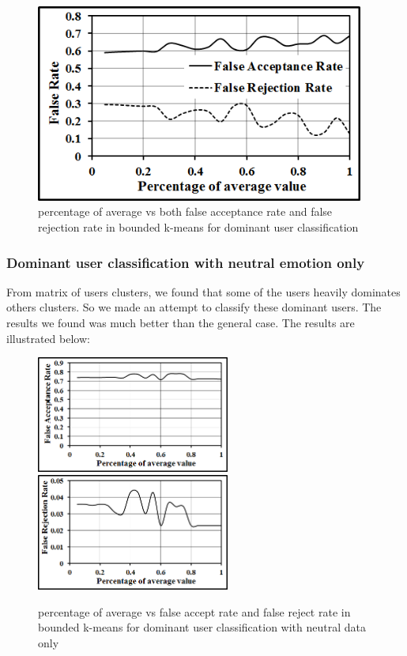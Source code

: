 \begin{figure}
\centering
\includegraphics[width=4.25in,clip,keepaspectratio]{Chapters/figures/User/dominant/fAfR}
\caption{percentage of average vs both false acceptance rate and false rejection rate in bounded k-means for dominant user classification}
\label{Optional 6}
\end{figure}


\clearpage
\subsubsection{Dominant user classification with neutral emotion only}
From matrix of users clusters, we found that some of the users heavily dominates others clusters. So we made an attempt to classify these dominant users. The results we found was much better than the general case. The results are illustrated below:

\begin{figure}
\centering
\includegraphics[width=2.5in,clip,keepaspectratio]{Chapters/figures/User/dominantWithNeutral/fA}
\includegraphics[width=2.5in,clip,keepaspectratio]{Chapters/figures/User/dominantWithNeutral/fR}
\caption{percentage of average vs false accept rate and false reject rate in bounded k-means for dominant user classification with neutral data only}
\label{Optional 6}
\end{figure}


